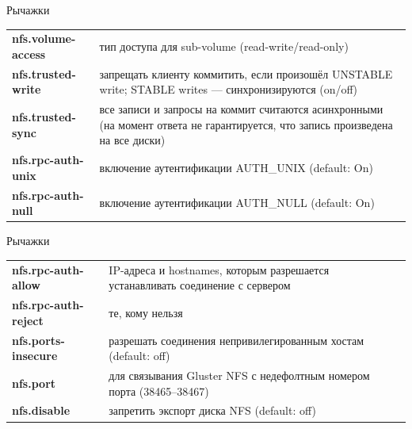 \documentclass{beamer}
\begin{document}
\begin{frame}{Рычажки}
	\begin{block}{}
		\begin{tabular}{ p{6cm} p{5cm} }
			\textbf{nfs.volume-access} & тип доступа для sub-volume (read-write/read-only) \\
			\textbf{nfs.trusted-write} & запрещать клиенту коммитить, если произошёл UNSTABLE write; STABLE writes --- синхронизируются (on/off) \\
			\textbf{nfs.trusted-sync} & все записи и запросы на коммит считаются асинхронными (на момент ответа не гарантируется, что запись произведена на все диски) \\
			\textbf{nfs.rpc-auth-unix} & включение аутентификации AUTH\_UNIX (default: On) \\
			\textbf{nfs.rpc-auth-null} & включение аутентификации AUTH\_NULL (default: On) \\
		\end{tabular}
	\end{block}
\end{frame}


\begin{frame}{Рычажки}
	\begin{block}{}
		\begin{tabular}{ p{6cm} p{5cm} }
			\textbf{nfs.rpc-auth-allow} & IP-адреса и hostnames, которым разрешается устанавливать соединение с сервером \\
			\textbf{nfs.rpc-auth-reject} & те, кому нельзя \\
			\textbf{nfs.ports-insecure} & разрешать соединения непривилегированным хостам (default: off) \\
			\textbf{nfs.port} & для связывания Gluster NFS с недефолтным номером порта (38465--38467)\\
			\textbf{nfs.disable} & запретить экспорт диска NFS (default: off) \\
		\end{tabular}
	\end{block}
\end{frame}
\end{document}
